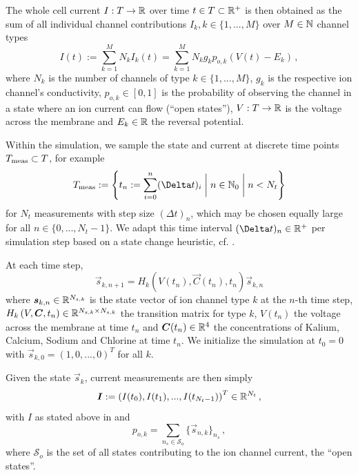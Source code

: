 \documentclass[USenglish,twocolumn]{article}
\begin{document}
  The whole cell current $I: T \rightarrow \mathbb{R}$ over time $t \in T \subset \mathbb{R}^+$ is then obtained as the sum of all individual channel contributions $I_k, k \in \{1, ..., M\}$ over $M \in \mathbb{N}$ channel types
  \begin{equation}
    I(t) := \sum_{k=1}^{M} N_k I_k(t) = \sum_{k=1}^{M} N_k g_k p_{o,k} \left(V(t)-E_k\right)\,,
    \label{eq:current}
  \end{equation}
  where $N_k$ is the number of channels of type $k \in \{1, ..., M\}$, $g_k$ is the respective ion channel's conductivity, $p_{o, k} \in [0, 1]$ is the probability of observing the channel in a state where an ion current can flow (``open states''), $V: T \rightarrow \mathbb{R}$ is the voltage across the membrane and $E_k \in \mathbb{R}$ the reversal potential.

  Within the simulation, we sample the state and current at discrete time points $T_{\rm meas} \subset T$, for example
  $$T_{\rm meas} := \left\{t_n := \sum_{i=0}^n (\Delta t)_i \;\bigg|\; n \in \N_0 \;\bigg|\; n < N_t\right\}$$
  for $N_t$ measurements with step size $(\Delta t)_n$, which may be chosen equally large for all $n \in \{0, ..., N_t - 1\}$.
  We adapt this time interval $(\Delta t)_n \in \R^+$ per simulation step based on a state change heuristic, cf. .

  At each time step,
  \begin{equation}
    \vec{s}_{k,n+1} = H_{k}\left(V(t_n), \vec{C}(t_n), t_n\right) \vec{s}_{k,n}
  \end{equation}
  where ${\bm{s}}_{k,n} \in \mathbb{R}^{N_{s,k}}$ is the state vector of ion channel type $k$ at the $n$-th time step, $H_{k}\left(V, {\bm{C}}, t_n\right) \in \mathbb{R}^{N_{s,k} \times N_{s,k}}$ the transition matrix for type $k$, $V(t_n)$ the voltage across the membrane at time $t_n$ and ${\bm{C}}(t_n) \in \mathbb{R}^4$ the concentrations of Kalium, Calcium, Sodium and Chlorine at time $t_n$.
  We initialize the simulation at $t_0 = 0$ with $\vec{s}_{k,0} = (1, 0, ..., 0)^T$ for all $k$.

  Given the state $\vec{s}_{k}$, current measurements are then simply
  $${\bm{I}} := \left(I(t_0), I(t_1), ..., I(t_{N_t-1})\right)^T \in \mathbb{R}^{N_t}\,,$$
  with $I$ as stated above in  and
  $$p_{o,k} = \sum_{n_s \in \mathcal{S}_o} \{\vec{s}_{n,k}\}_{n_s}\,,$$
  where $\mathcal{S}_o$ is the set of all states contributing to the ion channel current, the ``open states''.
\end{document}

